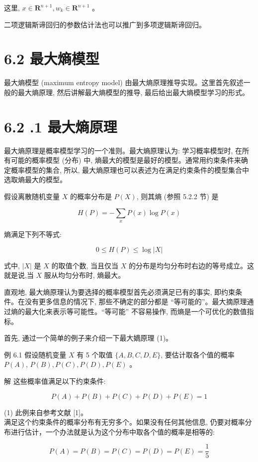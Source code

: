 \documentclass[10pt]{article}
\begin{document}
\begin{CJK*}{UTF8}{bsmi}
这里, $x \in \boldsymbol{R}^{n+1}, w_{k} \in \boldsymbol{R}^{n+1}$ 。

二项逻辑斯谛回归的参数估计法也可以推广到多项逻辑斯谛回归。

\section*{6.2 最大熵模型}
最大熵模型 (maximum entropy model) 由最大熵原理推导实现。这里首先叙述一般的最大熵原理, 然后讲解最大熵模型的推导, 最后给出最大熵模型学习的形式。

\section*{6.2 .1 最大熵原理}
最大熵原理是概率模型学习的一个准则。最大熵原理认为: 学习概率模型时, 在所有可能的概率模型 (分布) 中, 熵最大的模型是最好的模型。通常用约束条件来确定概率模型的集合, 所以, 最大熵原理也可以表述为在满足约束条件的模型集合中选取熵最大的模型。

假设离散随机变量 $X$ 的概率分布是 $P(X)$, 则其熵 (参照 5.2.2 节) 是


\begin{equation*}
H(P)=-\sum_{x} P(x) \log P(x) \tag{6.9}
\end{equation*}


熵满足下列不等式:

$$
0 \leqslant H(P) \leqslant \log |X|
$$

式中, $|X|$ 是 $X$ 的取值个数, 当且仅当 $X$ 的分布是均匀分布时右边的等号成立。这就是说,当 $X$ 服从均匀分布时, 熵最大。

直观地, 最大熵原理认为要选择的概率模型首先必须满足已有的事实, 即约束条件。在没有更多信息的情况下, 那些不确定的部分都是 “等可能的”。最大摘原理通过熵的最大化来表示等可能性。“等可能” 不容易操作, 而熵是一个可优化的数值指标。

首先, 通过一个简单的例子来介绍一下最大嫡原理 (1)。

例 6.1 假设随机变量 $X$ 有 5 个取值 $\{A, B, C, D, E\}$, 要估计取各个值的概率 $P(A)$, $P(B), P(C), P(D), P(E)$ 。

解 这些概率值满足以下约束条件:

$$
P(A)+P(B)+P(C)+P(D)+P(E)=1
$$

(1) 此例来自参考文献 [1]。\\
满足这个约束条件的概率分布有无穷多个。如果没有任何其他信息, 仍要对概率分布进行估计，一个办法就是认为这个分布中取各个值的概率是相等的:

$$
P(A)=P(B)=P(C)=P(D)=P(E)=\frac{1}{5}
$$


\end{CJK*}
\end{document}
